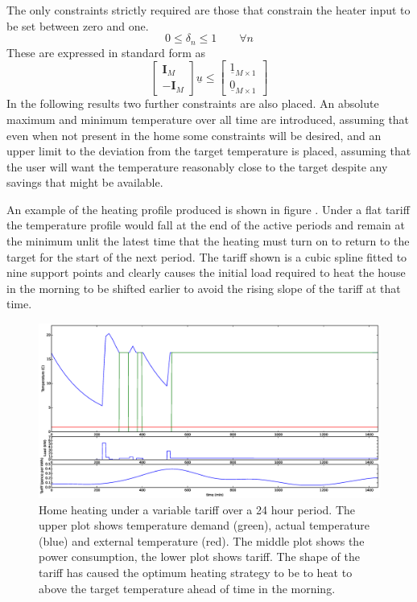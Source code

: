 \documentclass[a4paper, 10 pt, conference]{ieeeconf}  %
\begin{document}
The only constraints strictly required are those that constrain the heater input to be set between zero and one. 
\begin{equation}
0 \leq \delta_{n} \leq 1 \qquad \forall n
\end{equation}
These are expressed in standard form as
\begin{equation}
\left[
\begin{array}{c}
\mathbf{I}_{M} \\ \hline
- \mathbf{I}_{M} 
\end{array}\right]\underline{u} \leq \left[\begin{array}{c}
\underline{1}_{M \times 1} \\ \hline
\underline{0}_{M \times 1}
\end{array}\right]
\end{equation}
In the following results two further constraints are also placed. An absolute maximum and minimum temperature over all time are introduced, assuming that even when not present in the home some constraints will be desired, and an upper limit to the deviation from the target temperature is placed, assuming that the user will want the temperature reasonably close to the target despite any savings that might be available.

An example of the heating profile produced is shown in figure \cite{quadtemp}. Under a flat tariff the temperature profile would fall at the end of the active periods and remain at the minimum unlit the latest time that the heating must turn on to return to the target for the start of the next period. The tariff shown is a cubic spline fitted to nine support points and clearly causes the initial load required to heat the house in the morning to be shifted earlier to avoid the rising slope of the tariff at that time.

\begin{figure}[htb]
\centering
\includegraphics[width=\textwidth,trim =4cm 8cm 4cm 2cm,clip=True]{f4.eps}
\caption{Home heating under a variable tariff over a 24 hour period. The upper plot shows temperature demand (green), actual temperature (blue) and external temperature (red). The middle plot shows the power consumption, the lower plot shows tariff. The shape of the tariff has caused the optimum  heating strategy to be to heat to above the target temperature ahead of time in the morning.}
\label{quadtemp}
\end{figure}
\end{document}
